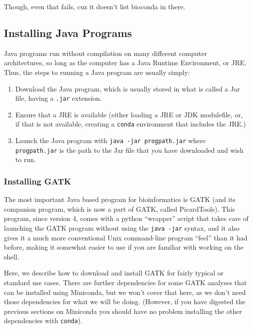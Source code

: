 \documentclass[]{krantz}
\providecommand{\tightlist}{%
  \setlength{\itemsep}{0pt}\setlength{\parskip}{0pt}}
\begin{document}
Though, even that fails, cuz it doesn't list bioconda in there.

\hypertarget{installing-java-programs}{%
\subsection{Installing Java Programs}\label{installing-java-programs}}

Java programs run without compilation on many different computer architectures, so long
as the computer has a Java Runtime Environment, or JRE. Thus, the steps to running a Java
program are usually simply:

\begin{enumerate}
\def\labelenumi{\arabic{enumi}.}
\tightlist
\item
  Download the Java program, which is usually stored in what is called a Jar file, having a
  \texttt{.jar} extension.
\item
  Ensure that a JRE is available (either loading a JRE or JDK modulefile, or, if that is not
  available, creating a \texttt{conda} environment that includes the JRE.)
\item
  Launch the Java program with \texttt{java\ -jar\ progpath.jar} where \texttt{progpath.jar} is the path to the
  Jar file that you have downloaded and wish to run.
\end{enumerate}

\hypertarget{installing-gatk}{%
\subsubsection{Installing GATK}\label{installing-gatk}}

The most important Java based program for bioinformatics is GATK (and its companion
program, which is now a part of GATK, called PicardTools). This program,
since version 4,
comes with a python ``wrapper'' script that takes care of launching the GATK program
without using the \texttt{java\ -jar} syntax, and it also gives it a much more conventional
Unix command-line program ``feel'' than it had before, making it somewhat easier
to use if you are familiar with working on the shell.

Here, we describe how to download and install GATK for fairly typical or standard use
cases. There are further dependencies for some GATK analyses that can be installed
using Miniconda, but we won't cover that here, as we don't need those dependencies
for what we will be doing. (However, if you have digested the previous sections on Miniconda
you should have no problem installing the other dependencies with \texttt{conda}).
\end{document}
